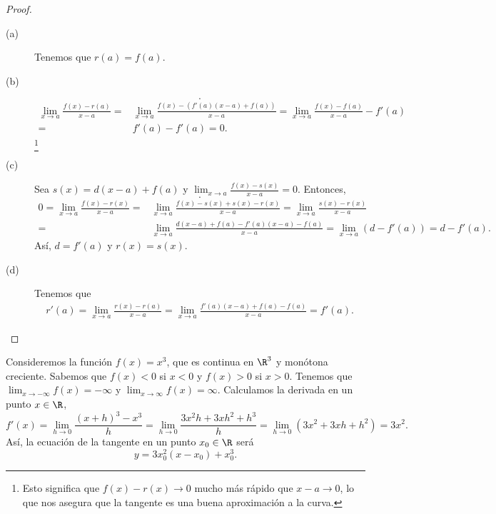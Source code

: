 \begin{proof}
\begin{description}
\item[(a)] Tenemos que $\displaystyle r\left(a\right) = f\left(a\right) $.
\item[(b)] 
	\[ .\]
	\[
	\begin{split}
		\lim_{x \to a}\frac{f\left(x\right)-r\left(a\right)}{x-a} = & \lim_{x \to a}\frac{f\left(x\right)-\left(f'\left(a\right)\left(x-a\right) + f\left(a\right)\right)}{x-a} = \lim_{x \to a}\frac{f\left(x\right)-f\left(a\right)}{x-a}-f'\left(a\right) \\
		= &  f'\left(a\right)-f'\left(a\right) = 0 .
	\end{split}
	\]
\footnote{Esto significa que $\displaystyle f\left(x\right) -r\left(x\right) \to 0 $ mucho más rápido que $\displaystyle x - a \to 0 $, lo que nos asegura que la tangente es una buena aproximación a la curva.} 	
\item[(c)] Sea $\displaystyle s\left(x\right) = d\left(x-a\right) + f\left(a\right) $ y $\displaystyle \lim_{x \to a} \frac{f\left(x\right)-s\left(x\right)}{x-a}= 0 $. Entonces,
	\[ .\]
	\[
	\begin{split}
		0 = \lim_{x \to a}\frac{f\left(x\right)-r\left(x\right)}{x-a} = & \lim_{x \to a}\frac{f\left(x\right)-s\left(x\right)+s\left(x\right)-r\left(x\right)}{x-a} = \lim_{x \to a}\frac{s\left(x\right)-r\left(x\right)}{x-a} \\
		= & \lim_{x \to a}\frac{d\left(x-a\right)+f\left(a\right)-f'\left(a\right)\left(x-a\right)-f\left(a\right)}{x-a} = \lim_{x \to a}\left(d-f'\left(a\right)\right) = d - f'\left(a\right) .
	\end{split}
	\]
	Así, $\displaystyle d = f'\left(a\right) $ y $\displaystyle r\left(x\right) = s\left(x\right) $.
\item[(d)] Tenemos que
	\[
	\begin{split}
	r'\left(a\right) = \lim_{x \to a}\frac{r\left(x\right)-r\left(a\right)}{x-a} = \lim_{x \to a}\frac{f'\left(a\right)\left(x-a\right)+f\left(a\right)-f\left(a\right)}{x-a} = f'\left(a\right) .
	\end{split}
	\]
\end{description}
\end{proof}
\begin{eg}
\normalfont Consideremos la función $\displaystyle f\left(x\right) = x^{3} $, que es continua en $\displaystyle \R^{3} $ y monótona creciente. Sabemos que $\displaystyle f\left(x\right) < 0 $ si $\displaystyle x < 0 $ y $\displaystyle f\left(x\right) > 0 $ si $\displaystyle x > 0 $. Tenemos que $\displaystyle \lim_{x \to -\infty}f\left(x\right) = -\infty $ y $\displaystyle \lim_{x \to \infty}f\left(x\right) = \infty $. Calculamos la derivada en un punto $\displaystyle x \in \R $,
\[ f'\left(x\right) = \lim_{h \to 0}\frac{\left(x+h\right)^{3}-x^{3}}{h} = \lim_{h \to 0}\frac{3x^{2}h+3xh^{2}+h^{3}}{h} = \lim_{h \to 0}\left(3x^{2}+3xh+h^{2}\right) = 3x^{2} .\]
Así, la ecuación de la tangente en un punto $\displaystyle x_{0} \in \R $ será
\[y = 3x_{0}^{2}\left(x-x_{0}\right) + x_{0}^{3} .\]
\end{eg}
